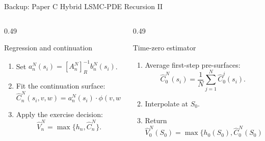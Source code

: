 \begin{frame}{Backup: Paper C Hybrid LSMC-PDE Recursion II}
  \scriptsize
  \begin{columns}[T,onlytextwidth]
    \begin{column}{0.49\textwidth}
      \begin{block}{Regression and continuation}
        \begin{enumerate}
          \item Set \(a_n^N(s_i)=[A_n^N]^{-1}_R b_n^N(s_i)\).
          \item Fit the continuation surface:
          \[
          \widehat C_n^N(s_i,v,w)=a_n^N(s_i)\cdot\phi(v,w).
          \]
          \item Apply the exercise decision:
          \[
          \widehat V_n^N=\max\{h_n,\widehat C_n^N\}.
          \]
        \end{enumerate}
      \end{block}
    \end{column}
    \begin{column}{0.49\textwidth}
      \begin{block}{Time-zero estimator}
        \begin{enumerate}
          \item Average first-step pre-surfaces:
          \[
          \widehat C_0^N(s_i)=\frac1N\sum_{j=1}^N\widehat C_0^j(s_i).
          \]
          \item Interpolate at \(S_0\).
          \item Return
          \[
          \widehat V_0^N(S_0)=\max\{h_0(S_0),\widehat C_0^N(S_0)\}.
          \]
        \end{enumerate}
      \end{block}
    \end{column}
  \end{columns}
\end{frame}
